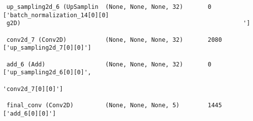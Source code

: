 \documentclass[
  letterpaper,
  DIV=11,
  numbers=noendperiod]{scrreprt}
\begin{document}
\begin{verbatim}
 up_sampling2d_6 (UpSamplin  (None, None, None, 32)       0         ['batch_normalization_14[0][0]
 g2D)                                                               ']                            
                                                                                                  
 conv2d_7 (Conv2D)           (None, None, None, 32)       2080      ['up_sampling2d_7[0][0]']     
                                                                                                  
 add_6 (Add)                 (None, None, None, 32)       0         ['up_sampling2d_6[0][0]',     
                                                                     'conv2d_7[0][0]']            
                                                                                                  
 final_conv (Conv2D)         (None, None, None, 5)        1445      ['add_6[0][0]']               
                                                                                                  

\end{verbatim}
\end{document}
